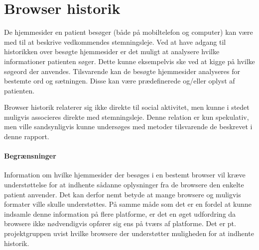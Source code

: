 \section{Browser historik}
De hjemmesider en patient besøger (både på mobiltelefon og computer) kan være med til at beskrive vedkommendes stemningsleje.
Ved at have adgang til historikken over besøgte hjemmesider er det muligt at analysere hvilke informationer patienten søger.
Dette kunne eksempelvis ske ved at kigge på hvilke søgeord der anvendes.
Tilsvarende kan de besøgte hjemmesider analyseres for bestemte ord og sætningen.
Disse kan være prædefinerede og/eller oplyst af patienten.

Browser historik relaterer sig ikke direkte til social aktivitet, men kunne i stedet muligvis associeres direkte med stemningsleje.
Denne relation er kun spekulativ, men ville sandsynligvis kunne undersøges med metoder tilsvarende de beskrevet i denne rapport.

\paragraph{Begrænsninger}
Information om hvilke hjemmesider der besøges i en bestemt browser vil kræve understøttelse for at indhente sådanne oplysninger fra de browsere den enkelte patient anvender.
Det kan derfor nemt betyde at mange browsere og muligvis formater ville skulle understøttes.
På samme måde som det er en fordel at kunne indsamle denne information på flere platforme, er det en øget udfordring da browsere ikke nødvendigvis opfører sig ens på tværs af platforme.
Det er pt. projektgruppen uvist hvilke browsere der understøtter muligheden for at indhente historik.